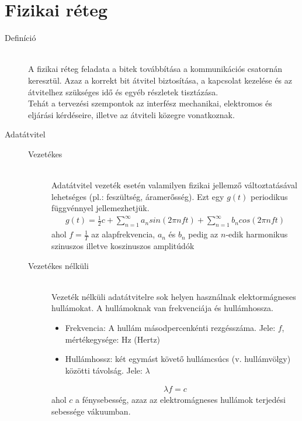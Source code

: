 \documentclass[margin=0px]{article}
\begin{document}
\section{Fizikai réteg}
\begin{description}
    \item[Definíció] \hfill \\
        A fizikai réteg feladata a bitek továbbítása a kommunikációs csatornán keresztül. Azaz a korrekt bit átvitel biztosítása, a kapcsolat kezelése és az átvitelhez szükséges idő és egyéb részletek tisztázása. \\
        Tehát a tervezési szempontok az interfész mechanikai, elektromos és eljárási kérdéseire, illetve az átviteli közegre vonatkoznak.
    \item[Adatátvitel] \hfill
        \begin{description}
            \item[Vezetékes] \hfill \\
                Adatátvitel vezeték esetén valamilyen fizikai jellemző változtatásával lehetséges (pl.: feszültség, áramerősség). Ezt egy $g(t)$ periodikus függvénnyel jellemezhetjük.
                \begin{align*}
                    g(t) = \frac{1}{2}c+ \sum\limits_{n=1}^\infty a_nsin(2\pi n f t) + \sum\limits_{n=1}^\infty b_ncos(2\pi n f t)
                \end{align*}
                ahol $f=\frac{1}{T}$ az alapfrekvencia, $a_n$ és $b_n$ pedig az $n$-edik harmonikus szinuszos illetve koszinuszos amplitúdók
            \item[Vezetékes nélküli] \hfill \\
                Vezeték nélküli adatátvitelre sok helyen használnak elektormágneses hullámokat. A hullámoknak van frekvenciája és hullámhossza.
                \begin{itemize}
                    \item Frekvencia:
                          A hullám másodpercenkénti rezgésszáma. Jele: $f$, mértékegysége: Hz (Hertz)
                    \item Hullámhossz: két egymást követő hullámcsúcs (v. hullámvölgy) közötti távolság. Jele: $\lambda$
                \end{itemize}
                \begin{align*}
                    \lambda f = c
                \end{align*}
                ahol $c$ a fénysebesség, azaz az elektromágneses hullámok terjedési sebessége vákuumban.

\end{description}
\end{description}
\end{document}
